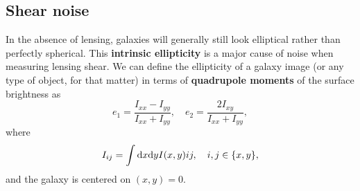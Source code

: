 \documentclass[11pt]{article} %
\DeclareRobustCommand{\d}{\ifmmode\text{d}\else d\fi}
\newcommand{\br}[1]{\ensuremath{\left( #1 \right)}}
\begin{document}

\subsection{Shear noise}
In the absence of lensing, galaxies will generally still look elliptical rather than perfectly spherical. This \textbf{intrinsic ellipticity} is a major cause of noise when measuring lensing shear. We can define the ellipticity of a galaxy image (or any type of object, for that matter) in terms of \textbf{quadrupole moments} of the surface brightness as
\begin{equation*}
	e_1 = \frac{I_{xx} - I_{yy}}{I_{xx} + I_{yy}}, \quad e_2 = \frac{2I_{xy}}{I_{xx} + I_{yy}},
\end{equation*}
where
\begin{equation*}
	I_{ij} = \int \d x\d y I(x,y)ij, \quad i,j\in\{x,y\},
\end{equation*}
and the galaxy is centered on $(x,y)=0$.
\end{document}
